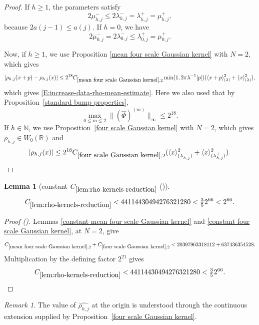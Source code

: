 \documentclass[12pt,reqno]{amsart}
\newcommand{\auto}{{({\tiny\faCar})}}
\theoremstyle{plain}
\newtheorem{lemma}[theorem]{Lemma}
\numberwithin{equation}{section}
\theoremstyle{remark}
\newtheorem{rem}{Remark}[section]
\newcommand{\uses}[1]{}
\newcommand{\usesdefs}[1]{}
\newcommand{\R}{{\mathbb R}}
\newcommand{\N}{{\mathbb N}}
\begin{document}
\begin{proof}
If \(h\geq1\), the parameters satisfy
\[
2\mu_{h,j}^-
\leq
2\lambda_{h,j}^-
=
\lambda_{h,j}^+
=
\mu_{h,j}^+,
\]
because \(2a(j-1)\leq a(j)\).
If $h=0$, we have
\[
2\mu_{0,j}^-
=
2\lambda_{0,j}^-
\leq
\lambda_{0,j}^+
=
\mu_{0,j}^+.
\]


Now, if $h\ge 1$, we  use Proposition
\ref{mean four scale Gaussian kernel}   with $N=2$, which  gives
\[|\rho_{h,j}(x+p)-\rho_{h,j}(x)| \le 2^{18} C_{\ref{mean four scale Gaussian kernel},2} \min(1,2\pi \lambda^{-1}|p|) (\langle x+p\rangle^2_{(\lambda)}+
\langle x\rangle^2_{(\lambda)}),
\]
which gives \eqref{E:increase-data-rho-mean-estimate}.
Here we also used that by Proposition~\ref{standard bump properties},
\[
\max_{0\leq m\leq2}
\|(\widehat\Phi)^{(m)}\|_\infty
\leq2^{18}.
\]
If $h\in \N$, we use  Proposition~\ref{four scale Gaussian kernel}   with $N=2$, which   gives $\rho_{h,j}\in W_0(\R)$ and
\[ |\rho_{h,j}(x)| \le 2^{18}C_{\ref{four scale Gaussian kernel},2} (\langle x\rangle^2_{(\lambda_{h,j}^-)} + \langle x\rangle^2_{(\lambda_{h,j}^+)}). \]
\end{proof}

\begin{lemma}[constant $C_{\ref{lem:rho-kernels-reduction}}$ \auto]\label{constant rho kernels reduction}\uses{lem:rho-kernels-reduction,constant mean four scale Gaussian kernel,constant four scale Gaussian kernel,mean four scale Gaussian kernel,four scale Gaussian kernel}\usesdefs{}
\begin{equation}\label{constant rho kernels reduction bound}
C_{\ref{lem:rho-kernels-reduction}}
<44114430494276321280<\tfrac35 2^{66}<2^{66}.
\end{equation}
\end{lemma}
\begin{proof}[Proof \auto]
Lemmas \ref{constant mean four scale Gaussian kernel} and \ref{constant four scale Gaussian kernel}, at $N=2$, give
\[
C_{\ref{mean four scale Gaussian kernel},2}
+C_{\ref{four scale Gaussian kernel},2}
<20397963318112+637436354528.
\]
Multiplication by the defining factor $2^{21}$ gives
\[
C_{\ref{lem:rho-kernels-reduction}}
<44114430494276321280<\tfrac35 2^{66}.
\]
\end{proof}


\begin{rem}
The value of $\widehat{\rho_{h,j}}$   at the origin is understood through the continuous
extension supplied by Proposition~\ref{four scale Gaussian kernel}.
\end{rem}
\end{document}
